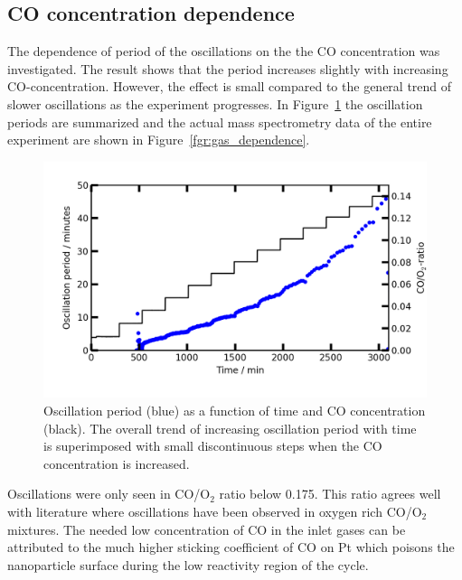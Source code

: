 \documentclass[journal=jacsat,manuscript=article]{achemso}
\begin{document}

\subsection{CO concentration dependence}
The dependence of period of the oscillations on the the CO concentration was
investigated. The result shows that the period increases slightly with
increasing CO-concentration. However, the effect is small compared to the
general trend of slower oscillations as the experiment progresses. In
Figure~\ref{fgr:gas_dependence_summary} the oscillation periods are summarized and the
actual mass spectrometry data of the entire experiment are shown in Figure~\ref{fgr:gas_dependence}.

\begin{figure}
  \includegraphics[width=12cm]{oscillations_gas_dependence_summary_supplemental.png}
  \caption{Oscillation period (blue) as a function of time and CO concentration (black). The
  overall trend of increasing oscillation period with time is superimposed with small
  discontinuous steps when the CO concentration is increased.} 
  \label{fgr:gas_dependence_summary}
\end{figure}

Oscillations were only seen in CO/O$_2$ ratio below 0.175. This ratio agrees
well with literature \cite{Singh2010,Hendriksen2005} where oscillations have
been observed in oxygen rich CO/O$_2$ mixtures. The needed low concentration of
CO in the inlet gases can be attributed to the much higher sticking coefficient
of CO on Pt which poisons the nanoparticle surface during the low reactivity
region of the cycle.
\end{document}
